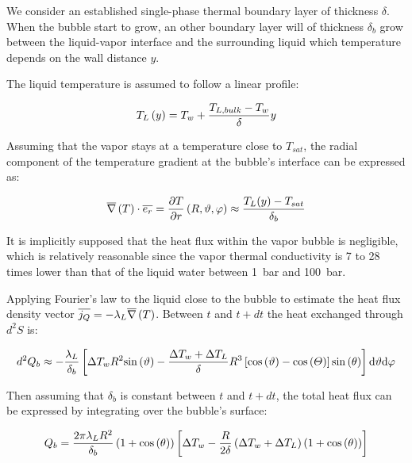 We consider an established single-phase thermal boundary layer of thickness $\delta$. When the bubble start to grow, an other boundary layer will of thickness $\delta_{b}$ grow between the liquid-vapor interface and the surrounding liquid which temperature depends on the wall distance $y$.


\npar


The liquid temperature is assumed to follow a linear profile:

\begin{align}
T_{L}\left( y \right)=T_{w}+\frac{T_{L,bulk}-T_{w}}{\delta} y
\end{align}


Assuming that the vapor stays at a temperature close to $T_{sat}$, the radial component of the temperature gradient at the bubble's interface can be expressed as:

\begin{align}
\overline{\nabla}\left({T}\right) \cdot \overline{e_{r}} = \frac{\partial T}{\partial r}\left( R, \vartheta, \varphi \right) \approx\frac{T_{L}(y)-T_{sat}}{\delta_{b}}
\end{align}


\begin{note*}{}
It is implicitly supposed that the heat flux within the vapor bubble is negligible, which is relatively reasonable since the vapor thermal conductivity is 7 to 28 times lower than that of the liquid water between 1\ bar and 100\ bar.
\end{note*}

\npar



Applying Fourier's law to the liquid close to the bubble to estimate the heat flux density vector $\overline{j_{Q}}=-\lambda_{L} \overline{\nabla}\left({T}\right)$. Between $t$ and $t+dt$ the heat exchanged through $d^{2}S$ is:

\begin{align}
d^{2}Q_{b} \approx -\frac{\lambda_{L}}{\delta_{b}}\left[  \Delta T_{w}R^{2}\mathrm{sin}\left( \vartheta \right)-\frac{\Delta T_{w}+\Delta T_{L}}{\delta}R^{3}\left[  \mathrm{cos}\left( \vartheta \right)-\mathrm{cos}\left( \varTheta \right)  \right] \mathrm{sin}\left( \theta \right)  \right] \mathrm{d}\vartheta \mathrm{d}\varphi
\end{align}

\npar
Then assuming that $\delta_{b}$ is constant between $t$ and $t+dt$, the total heat flux can be expressed by integrating over the bubble's surface:

\begin{align}
Q_{b}=\frac{2\pi \lambda_{L} R^{2}}{\delta_{b}} \left( 1+\mathrm{cos}\left( \theta \right)  \right) \left[ \Delta T_{w} - \frac{R}{2\delta}\left(  \Delta T_{w} + \Delta T_{L}  \right)  \left( 1 + \mathrm{cos}\left( \theta \right) \right)  \right]
\end{align}

